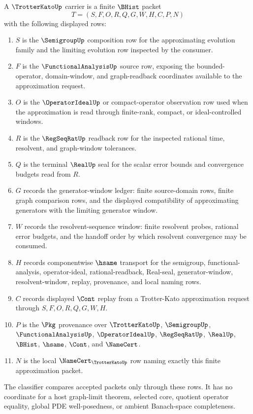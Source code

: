 \begin{definition}
\label{def:trotter-kato-generator-window-carrier}
A $\TrotterKatoUp$ carrier is a finite $\BHist$ packet
$$
T=(S,F,O,R,Q,G,W,H,C,P,N)
$$
with the following displayed rows:
\begin{enumerate}
\item $S$ is the $\SemigroupUp$ composition row for the approximating evolution family and the limiting evolution row inspected by the consumer.
\item $F$ is the $\FunctionalAnalysisUp$ source row, exposing the bounded-operator, domain-window, and graph-readback coordinates available to the approximation request.
\item $O$ is the $\OperatorIdealUp$ or compact-operator observation row used when the approximation is read through finite-rank, compact, or ideal-controlled windows.
\item $R$ is the $\RegSeqRatUp$ readback row for the inspected rational time, resolvent, and graph-window tolerances.
\item $Q$ is the terminal $\RealUp$ seal for the scalar error bounds and convergence budgets read from $R$.
\item $G$ records the generator-window ledger: finite source-domain rows, finite graph comparison rows, and the displayed compatibility of approximating generators with the limiting generator window.
\item $W$ records the resolvent-sequence window: finite resolvent probes, rational error budgets, and the handoff order by which resolvent convergence may be consumed.
\item $H$ records componentwise $\hsame$ transport for the semigroup, functional-analysis, operator-ideal, rational-readback, Real-seal, generator-window, resolvent-window, replay, provenance, and local naming rows.
\item $C$ records displayed $\Cont$ replay from a Trotter-Kato approximation request through $S,F,O,R,Q,G,W,H$.
\item $P$ is the $\Pkg$ provenance over $\TrotterKatoUp$, $\SemigroupUp$, $\FunctionalAnalysisUp$, $\OperatorIdealUp$, $\RegSeqRatUp$, $\RealUp$, $\BHist$, $\hsame$, $\Cont$, and $\NameCert$.
\item $N$ is the local $\NameCert_{\TrotterKatoUp}$ row naming exactly this finite approximation packet.
\end{enumerate}
The classifier compares accepted packets only through these rows. It has no coordinate for a host graph-limit theorem, selected core, quotient operator equality, global PDE well-posedness, or ambient Banach-space completeness.
\end{definition}

